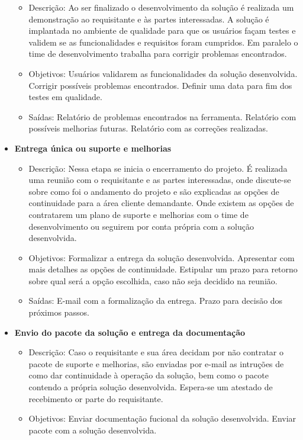\begin{itemize}
		\begin{itemize}
			\item Descrição: Ao ser finalizado o desenvolvimento da solução é realizada um demonstração ao requisitante e às partes interessadas.
			A solução é implantada no ambiente de qualidade para que os usuários façam testes e validem se as funcionalidades e requisitos foram cumpridos.
			Em paralelo o time de desenvolvimento trabalha para corrigir problemas encontrados.
			\item Objetivos: Usuários validarem as funcionalidades da solução desenvolvida. Corrigir possíveis problemas encontrados. Definir uma data para fim dos testes em qualidade. 
			\item Saídas: Relatório de problemas encontrados na ferramenta. Relatório com possíveis melhorias futuras. Relatório com as correções realizadas.
		\end{itemize}
		\item \textbf{Entrega única ou suporte e melhorias}
		\begin{itemize}
			\item Descrição: Nessa etapa se inicia o encerramento do projeto. É realizada uma reunião com o requisitante e as partes interessadas, onde discute-se
			sobre como foi o andamento do projeto e são explicadas as opções de continuidade para a área cliente demandante. Onde existem as opções de contratarem 
			um plano de suporte e melhorias com o time de desenvolvimento ou seguirem por conta própria com a solução desenvolvida. 
			\item Objetivos: Formalizar a entrega da solução desenvolvida. Apresentar com mais detalhes as opções de continuidade. Estipular um prazo para retorno sobre qual será a opção escolhida, caso não seja decidido na reunião.
			\item Saídas: E-mail com a formalização da entrega. Prazo para decisão dos próximos passos.
		\end{itemize}
		\item \textbf{Envio do pacote da solução e entrega da documentação}
		\begin{itemize}
			\item Descrição: Caso o requisitante e sua área decidam por não contratar o pacote de suporte e melhorias, são enviadas por e-mail as intruções de como dar continuidade à operação da solução, bem como o pacote contendo a própria solução desenvolvida. Espera-se um atestado de recebimento or parte do requisitante.
			\item Objetivos: Enviar documentação fucional da solução desenvolvida. Enviar pacote com a solução desenvolvida.

\end{itemize}
\end{itemize}
